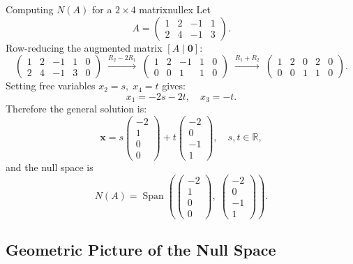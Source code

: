 \documentclass[12pt,a4paper]{article}
\newcommand{\R}{\mathbb{R}}
\newcommand{\vv}[1]{\mathbf{#1}}
\newcommand{\vzero}{\mathbf{0}}
\DeclareMathOperator{\Span}{Span}
\begin{document}
\begin{example}{Computing $N(A)$ for a $2\times 4$ matrix}{nullex}
  Let
  \[
    A = \begin{pmatrix} 1 & 2 & -1 & 1 \\ 2 & 4 & -1 & 3 \end{pmatrix}.
  \]
  Row-reducing the augmented matrix $[A \mid \vzero]$:
  \[
    \begin{pmatrix}
      1 & 2 & -1 & 1 & 0 \\
      2 & 4 & -1 & 3 & 0
    \end{pmatrix}
    \;\xrightarrow{R_2 - 2R_1}\;
    \begin{pmatrix}
      1 & 2 & -1 & 1 & 0 \\
      0 & 0 &  1 & 1 & 0
    \end{pmatrix}
    \;\xrightarrow{R_1 + R_2}\;
    \begin{pmatrix}
      1 & 2 & 0 & 2 & 0 \\
      0 & 0 & 1 & 1 & 0
    \end{pmatrix}.
  \]
  Setting free variables $x_2 = s,\; x_4 = t$ gives:
  \[
    x_1 = -2s - 2t, \quad x_3 = -t.
  \]
  Therefore the general solution is:
  \[
    \vv{x}
    = s\begin{pmatrix}-2\\1\\0\\0\end{pmatrix}
    + t\begin{pmatrix}-2\\0\\-1\\1\end{pmatrix},
    \quad s, t \in \R,
  \]
  and the null space is
  \[
    N(A) = \Span\!\left(
      \begin{pmatrix}-2\\1\\0\\0\end{pmatrix},\;
      \begin{pmatrix}-2\\0\\-1\\1\end{pmatrix}
    \right).
  \]
\end{example}

\subsection{Geometric Picture of the Null Space}
\end{document}
